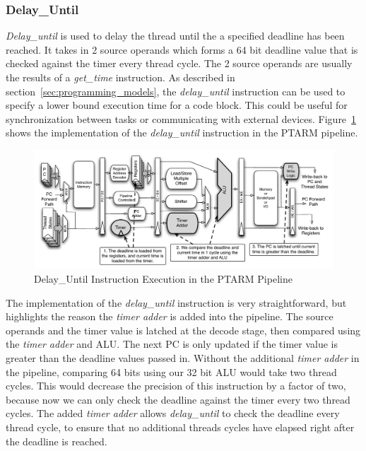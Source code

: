 
\subsubsection{Delay\_Until}    
\emph{Delay\_until} is used to delay the thread until the a specified deadline has been reached.
It takes in 2 source operands which forms a 64 bit deadline value that is checked against the timer every thread cycle.
The 2 source operands are usually the results of a \emph{get\_time} instruction.  
As described in section~\ref{sec:programming_models}, the \emph{delay\_until} instruction can be used to specify a lower bound execution time for a code block.
This could be useful for synchronization between tasks or communicating with external devices.
Figure~\ref{fig:delay_until_pipeline_implementation} shows the implementation of the \emph{delay\_until} instruction in the PTARM pipeline.       
\begin{figure}
  \vspace{-20pt}
  \begin{center}
    \includegraphics[scale=.54]{figs/delay_until_pipeline_implementation}
  \end{center}
  \vspace{-20pt}
  \caption{Delay\_Until Instruction Execution in the PTARM Pipeline}
  \label{fig:delay_until_pipeline_implementation}
\end{figure}

The implementation of the \emph{delay\_until} instruction is very straightforward, but highlights the reason the \emph{timer adder} is added into the pipeline.
The source operands and the timer value is latched at the decode stage, then compared using the \emph{timer adder} and ALU. 
The next PC is only updated if the timer value is greater than the deadline values passed in.  
Without the additional \emph{timer adder} in the pipeline, comparing 64 bits using our 32 bit ALU would take two thread cycles. 
This would decrease the precision of this instruction by a factor of two, because now we can only check the deadline against the timer every two thread cycles.
The added \emph{timer adder} allows \emph{delay\_until} to check the deadline every thread cycle, to ensure that no additional threads cycles have elapsed right after the deadline is reached. 

